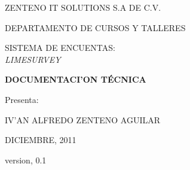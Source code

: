 \documentclass[12pt,spanish]{report}
\begin{document}
\begin{center}
\LARGE{ZENTENO IT SOLUTIONS S.A DE C.V.}\\
\end{center}

\vspace{0.05in}

\begin{center}
\large{DEPARTAMENTO DE CURSOS Y TALLERES}\\
\end{center}

\vspace{0.1in}

\par
\centerline{\hbox{}}
\par

\vspace{0.1in}

\begin{center}
\LARGE{SISTEMA DE ENCUENTAS:}\\
\emph{LIMESURVEY}\\
\end{center}

\vspace{0.1in}

\begin{center}
{\bfseries{DOCUMENTACI'ON  T\'ECNICA}}\\
\end{center}

\begin{center}
\large{Presenta:}\\
\end{center}

\vspace{0.1in}

\begin{center}
\Large{IV'AN ALFREDO ZENTENO AGUILAR}\\
\end{center}

\vspace{0.5in}

\begin{center}
{DICIEMBRE, 2011}
\end{center}
\begin{center}
{version, 0.1}
\end{center}

\end{document}
